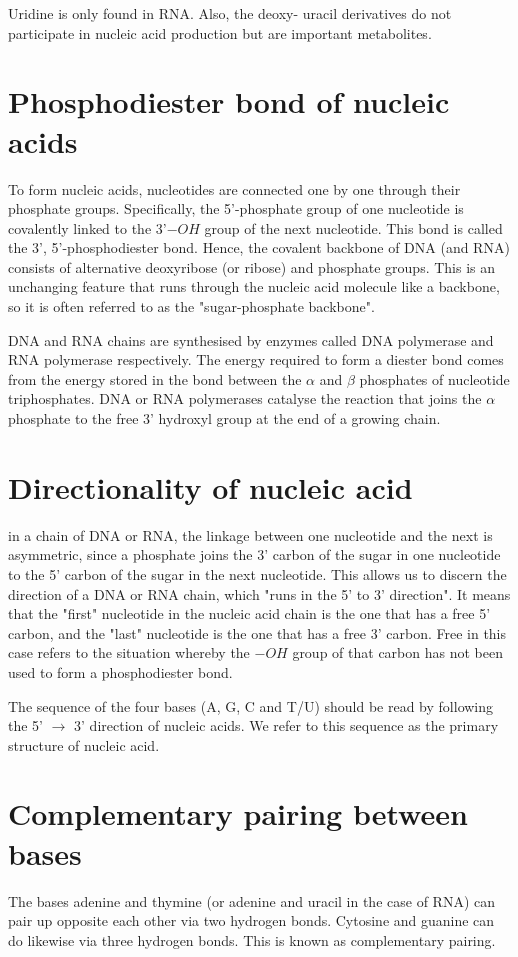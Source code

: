 \documentclass[11pt]{article}
\begin{document}
Uridine is only found in RNA. Also, the deoxy- uracil derivatives do not participate in nucleic acid production but are important metabolites.

\newpage
\section{Phosphodiester bond of nucleic acids}
\label{sec:org032924b}
To form nucleic acids, nucleotides are connected one by one through their phosphate groups. Specifically, the 5'-phosphate group of one nucleotide is covalently linked to the 3'\(-OH\) group of the next nucleotide. This bond is called the 3', 5'-phosphodiester bond. Hence, the covalent backbone of DNA (and RNA) consists of alternative deoxyribose (or ribose) and phosphate groups. This is an unchanging feature that runs through the nucleic acid molecule like a backbone, so it is often referred to as the "sugar-phosphate backbone".


DNA and RNA chains are synthesised by enzymes called DNA polymerase and RNA polymerase respectively. The energy required to form a diester bond comes from the energy stored in the bond between the \(\alpha\) and \(\beta\) phosphates of nucleotide triphosphates. DNA or RNA polymerases catalyse the reaction that joins the \(\alpha\) phosphate to the free 3' hydroxyl group at the end of a growing chain.
\section{Directionality of nucleic acid}
\label{sec:orgbbc854b}
in a chain of DNA or RNA, the linkage between one nucleotide and the next is asymmetric, since a phosphate joins the 3' carbon of the sugar in one nucleotide to the 5' carbon of the sugar in the next nucleotide. This allows us to discern the direction of a DNA or RNA chain, which "runs in the 5' to 3' direction". It means that the "first" nucleotide in the nucleic acid chain is the one that has a free 5' carbon, and the "last" nucleotide is the one that has a free 3' carbon. Free in this case refers to the situation whereby the \(-OH\) group of that carbon has not been used to form a phosphodiester bond.


The sequence of the four bases (A, G, C and T/U) should be read by following the 5' \(\rightarrow\) 3' direction of nucleic acids. We refer to this sequence as the primary structure of nucleic acid.
\section{Complementary pairing between bases}
\label{sec:org311517f}
The bases adenine and thymine (or adenine and uracil in the case of RNA) can pair up opposite each other via two hydrogen bonds. Cytosine and guanine can do likewise via three hydrogen bonds. This is known as complementary pairing.
\end{document}
